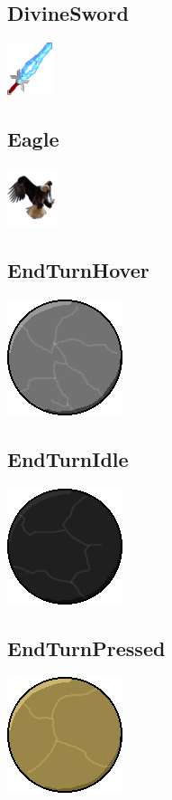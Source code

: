 \documentclass[a4paper,12pt]{scrartcl}
\begin{document}
	\subsection{DivineSword}
	\begin{center}\includegraphics{Prog2_EA_V2/Art/DivineSword.png}\end{center}
	\subsection{Eagle}
	\begin{center}\includegraphics{Prog2_EA_V2/Art/Eagle.png}\end{center}
	\subsection{EndTurnHover}
	\begin{center}\includegraphics{Prog2_EA_V2/Art/EndTurnHover.png}\end{center}
	\subsection{EndTurnIdle}
	\begin{center}\includegraphics{Prog2_EA_V2/Art/EndTurnIdle.png}\end{center}
	\subsection{EndTurnPressed}
	\begin{center}\includegraphics{Prog2_EA_V2/Art/EndTurnPressed.png}\end{center}
\end{document}
